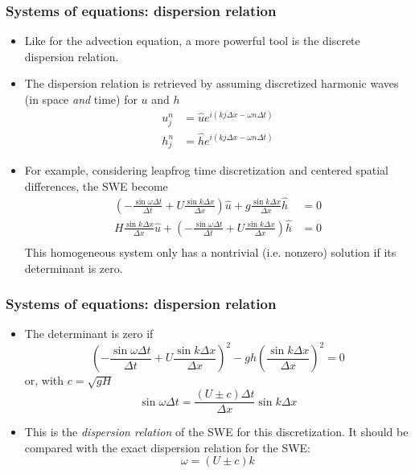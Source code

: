 \documentclass[aspectratio=149,9pt]{beamer}
\begin{document}
%
\begin{frame}
	\frametitle{Systems of equations: dispersion relation}
	\begin{itemize}
		\item Like for the advection equation, a more powerful tool is the discrete dispersion relation.
		\item The dispersion relation is retrieved by assuming discretized harmonic waves (in space \emph{and} time) for $u$ and $h$
			\begin{align*}
				u_j^n&=\hat u e^{i\left(k j \Delta x- \omega n \Delta t\right)}	\\
				h_j^n&=\hat h e^{i\left(k j \Delta x- \omega n \Delta t\right)}
			\end{align*}
		\item For example, considering leapfrog time discretization and centered spatial differences, the SWE become
			\begin{align*}
					\left(-\frac{\sin \omega \Delta t}{\Delta t} + U\frac{\sin k \Delta x}{\Delta x}\right) \hat u	+	g \frac{\sin k \Delta x}{\Delta x}\hat h	&	= 0	\\
					H \frac{\sin k \Delta x}{\Delta x}\hat u + \left(-\frac{\sin \omega \Delta t}{\Delta t} + U\frac{\sin k \Delta x}{\Delta x}\right) \hat h	&	= 0	\\
			\end{align*}
			This homogeneous system only has a nontrivial (i.e. nonzero) solution if its determinant is zero.
	\end{itemize}
\end{frame}
%
%
\begin{frame}
	\frametitle{Systems of equations: dispersion relation}
	\begin{itemize}
		\item The determinant is zero if
			\begin{equation*}
				\left(-\frac{\sin \omega \Delta t}{\Delta t} + U\frac{\sin k \Delta x}{\Delta x}\right)^2-gh\left(\frac{\sin k \Delta x}{\Delta x}\right)^2=0
			\end{equation*} 
			or, with $c=\sqrt{gH}$
			\begin{equation*}
				\sin\omega \Delta t=\frac{(U\pm c)\Delta t}{\Delta x}\sin k \Delta x
			\end{equation*}\vspace*{2ex}
		\item This is the \emph{dispersion relation} of the SWE for this discretization. It should be compared with the exact dispersion relation for the SWE:
			\begin{equation*}
				\omega=(U\pm c) k
			\end{equation*}
	\end{itemize}
\end{frame}
\end{document}
